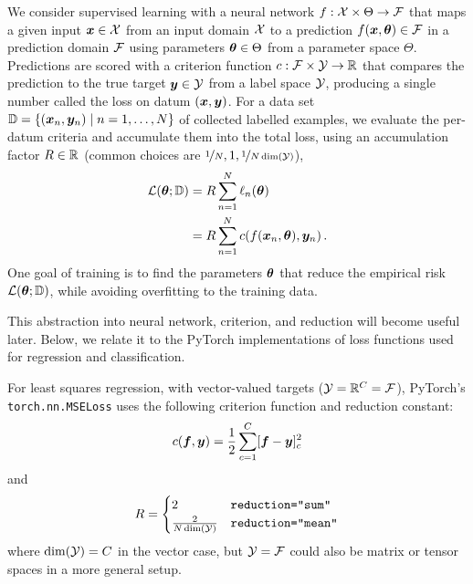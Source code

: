 We consider supervised learning with a neural network $f: {\mathcal{X}} \times \Theta \to {\mathcal{F}}$ that maps a given input ${\bm{x}} \in {\mathcal{X}}$ from an input domain ${\mathcal{X}}$ to a prediction $f({\bm{x}}, {\bm{\theta}}) \in {\mathcal{F}}$ in a prediction domain ${\mathcal{F}}$ using parameters ${\bm{\theta}} \in \Theta$ from a parameter space $\Theta$.
Predictions are scored with a criterion function $c: {\mathcal{F}} \times {\mathcal{Y}} \to {\mathbb{R}}$ that compares the prediction to the true target ${\bm{y}} \in {\mathcal{Y}}$ from a label space ${\mathcal{Y}}$, producing a single number called the loss on datum $({\bm{x}}, {\bm{y}})$.
For a data set ${\mathbb{D}} = \{({\bm{x}}_n, {\bm{y}}_n) \mid n=1, \dots, N\}$ of collected labelled examples, we evaluate the per-datum criteria and accumulate them into the total loss, using an accumulation factor $R \in {\mathbb{R}}$ (common choices are $\nicefrac{1}{N}, 1, \nicefrac{1}{N \dim({\mathcal{Y}})}$),
\begin{align}\label{eq:empirical_risk}
  \begin{split}
    {\mathcal{L}}({\bm{\theta}}; {\mathbb{D}}) & = R \sum_{n=1}^N \ell_n({\bm{\theta}})
    \\
                      & = R \sum_{n=1}^N c(f({\bm{x}}_n, {\bm{\theta}}), {\bm{y}}_n)\,.
  \end{split}
\end{align}
One goal of training is to find the parameters ${\bm{\theta}}$ that reduce the empirical risk ${\mathcal{L}}({\bm{\theta}}; {\mathbb{D}})$, while avoiding overfitting to the training data.

This abstraction into neural network, criterion, and reduction will become useful later.
Below, we relate it to the PyTorch implementations of loss functions used for regression and classification.

\begin{example}\label{ex:square_loss}
  For least squares regression, with vector-valued targets (${\mathcal{Y}} = {\mathbb{R}}^C = {\mathcal{F}}$), PyTorch's \texttt{torch.nn.MSELoss} uses the following criterion function and reduction constant:
  \begin{align*}
    c({\bm{f}}, {\bm{y}})
    =
    \frac{1}{2}\sum_{c=1}^C [{\bm{f}} - {\bm{y}}]_c^2
  \end{align*}
  and
  \begin{align*}
    R
    =
    \begin{cases}
      2                     & \text{\texttt{reduction="sum"}}
      \\
      \frac{2}{N \dim({\mathcal{Y}})} & \text{\texttt{reduction="mean"}}
    \end{cases}
  \end{align*}
  where $\dim({\mathcal{Y}}) = C$ in the vector case, but ${\mathcal{Y}} = {\mathcal{F}}$ could also be matrix or tensor spaces in a more general setup.
\end{example}


